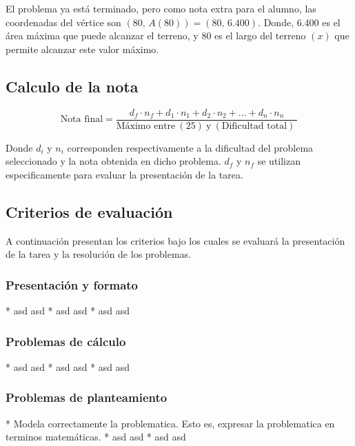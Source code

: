 \documentclass[
  titulo=Tarea,
  subtitulo=Función cuadrática,
  curso=Segundo medio
]{srs3}
\begin{document}
El problema ya está terminado, pero como nota extra para el alumno,
las coordenadas del vértice son
\(\left(80,\,A\left(80\right)\right) = (80,\, 6.400)\). Donde, 6.400
es el área máxima que puede alcanzar el terreno, y 80 es el largo
del terreno \(\left(x\right)\) que permite alcanzar este valor máximo.

\subsection*{Calculo de la nota}

\begin{equation*}
  \text{Nota final} = \dfrac{d_{f}\cdot n_{f} + d_1 \cdot n_1+d_2 \cdot n_2+\dots+d_n \cdot n_n}{\text{Máximo entre}~\left(25\right)~\text{y}~\left(\text{Dificultad total}\right)~}
\end{equation*}

Donde $d_i$ y $n_i$ corresponden respectivamente a la dificultad del problema
seleccionado y la nota obtenida en dicho problema. $d_f$ y $n_f$ se utilizan
especificamente para evaluar la presentación de la tarea.

\subsection*{Criterios de evaluación}

A continuación presentan los criterios bajo los cuales se evaluará la
presentación de la tarea y la resolución de los problemas.

\subsubsection*{Presentación y formato}
\begin{lista}
* asd asd
* asd asd
* asd asd
\end{lista}
\subsubsection*{Problemas de cálculo}
\begin{lista}
* asd asd
* asd asd
* asd asd
\end{lista}
\subsubsection*{Problemas de planteamiento}
\begin{lista}
* Modela correctamente la problematica. Esto es, expresar la problematica
en terminos matemáticas.
* asd asd
* asd asd
\end{lista}
\end{document}
